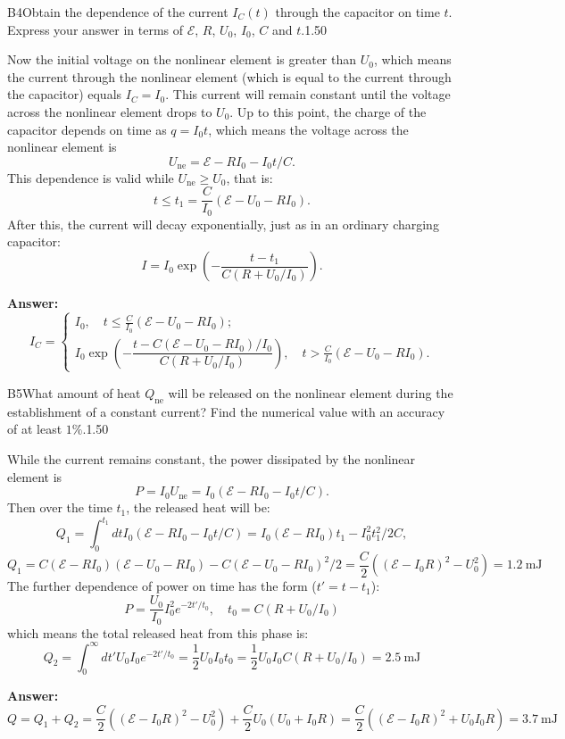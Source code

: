 \documentclass[11pt,a4paper]{article}
\begin{document}
\begin{solcard}{B4}{Obtain the dependence of the current $I_C(t)$ through the capacitor on time $t$. Express your answer in terms of $\mathcal{E}$, $R$, $U_0$, $I_0$, $C$ and $t$.}{1.50}

Now the initial voltage on the nonlinear element is greater than $U_0$, which means the current through the nonlinear element (which is equal to the current through the capacitor) equals $I_C = I_0$. This current will remain constant until the voltage across the nonlinear element drops to $U_0$. Up to this point, the charge of the capacitor depends on time as $q = I_0 t$, which means the voltage across the nonlinear element is $$ U_{\text{ne}}  = \mathcal{E} - R I_0 -I_0 t/C. $$This dependence is valid while $U_{\text{ne}} \ge U_0$, that is: $$ t \le t_1 = \frac{C}{I_0} (\mathcal{E}   - U_0 - R I_0 ). $$After this, the current will decay exponentially, just as in an ordinary charging capacitor: $$ I = I_0 \exp\left(- \dfrac{t- t_1}{C(R + U_0/I_0)}\right). $$

\par\smallskip\noindent\textbf{Answer:} $$ I_C = \begin{cases} I_0, \quad t \le \frac{C}{I_0} (\mathcal{E} - U_0 - R I_0 );\\ I_0 \exp\left(- \dfrac{t- C(\mathcal{E}-U_0 - R I_0)/I_0}{C(R + U_0/I_0)}\right), \quad t >\frac{C}{I_0} (\mathcal{E}  -U_0- R I_0 ). \end{cases} $$
\end{solcard}

\begin{solcard}{B5}{What amount of heat $Q_\text{ne}$ will be released on the nonlinear element during the establishment of a constant current? Find the numerical value with an accuracy of at least $1\%$.}{1.50}

While the current remains constant, the power dissipated by the nonlinear element is $$ P = I_0 U_{\text{ne}} = I_0 (\mathcal{E}  - R I_0 -I_0 t/C). $$Then over the time $t_1$, the released heat will be: $$ Q_1 = \int_0^{t_1} dt I_0 (\mathcal{E}  - R I_0 -I_0 t/C) = I_0 (\mathcal{E} - R I_0) t_1 - I_0 ^2t_1^2/2C, $$$$ Q_1 = C(\mathcal{E} - R I_0)(\mathcal{E} -U_0- R I_0) -  C(\mathcal{E}-U_0 - R I_0)^2/2 = \frac{C}{2} \left( (\mathcal{E} - I_0 R)^2  - U_0^2\right) = 1.2~\mathrm{mJ} $$The further dependence of power on time has the form ($t' = t - t_1$): $$ P = \frac{U_0}{I_0} I_0^2 e^{- 2t'/t_0}, \quad t_0 = C (R + U_0/I_0) $$which means the total released heat from this phase is: $$ Q_2 = \int_0 ^\infty dt' U_0 I_0  e^{- 2t'/t_0} = \frac{1}{2} U_0 I_0 t_0 = \frac{1}{2} U_0 I_0 C (R + U_0/I_0) = 2.5~\mathrm{mJ} $$

\par\smallskip\noindent\textbf{Answer:} $$Q = Q_1 + Q_2  = \frac{C}{2} \left( (\mathcal{E} - I_0 R)^2  - U_0^2\right) + \frac{C}{2} U_0 (U_0 + I_0 R)  =  \frac{C}{2} \left((\mathcal{E} - I_0 R)^2 + U_0 I_0 R \right) = 3.7~\mathrm{mJ}$$
\end{solcard}
\end{document}
